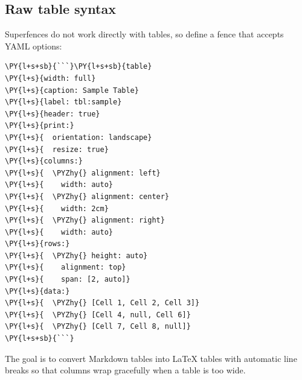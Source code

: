 \documentclass[a4paper,twoside]{article}
\begin{document}
\subsection{Raw table syntax}
Superfences do not work directly with tables, so define a  fence that accepts YAML options:
\begin{tscode}[lang=markdown, engine=pygments]
\begin{Verbatim}[commandchars=\\\{\},breaklines, breakanywhere, commandchars=\\\{\}]
\PY{l+s+sb}{```}\PY{l+s+sb}{table}
\PY{l+s}{width: full}
\PY{l+s}{caption: Sample Table}
\PY{l+s}{label: tbl:sample}
\PY{l+s}{header: true}
\PY{l+s}{print:}
\PY{l+s}{  orientation: landscape}
\PY{l+s}{  resize: true}
\PY{l+s}{columns:}
\PY{l+s}{  \PYZhy{} alignment: left}
\PY{l+s}{    width: auto}
\PY{l+s}{  \PYZhy{} alignment: center}
\PY{l+s}{    width: 2cm}
\PY{l+s}{  \PYZhy{} alignment: right}
\PY{l+s}{    width: auto}
\PY{l+s}{rows:}
\PY{l+s}{  \PYZhy{} height: auto}
\PY{l+s}{    alignment: top}
\PY{l+s}{    span: [2, auto]}
\PY{l+s}{data:}
\PY{l+s}{  \PYZhy{} [Cell 1, Cell 2, Cell 3]}
\PY{l+s}{  \PYZhy{} [Cell 4, null, Cell 6]}
\PY{l+s}{  \PYZhy{} [Cell 7, Cell 8, null]}
\PY{l+s+sb}{```}
\end{Verbatim}
\end{tscode}
The goal is to convert Markdown tables into \LaTeX{} tables with automatic line breaks so that columns wrap gracefully when a table is too wide.
\end{document}
